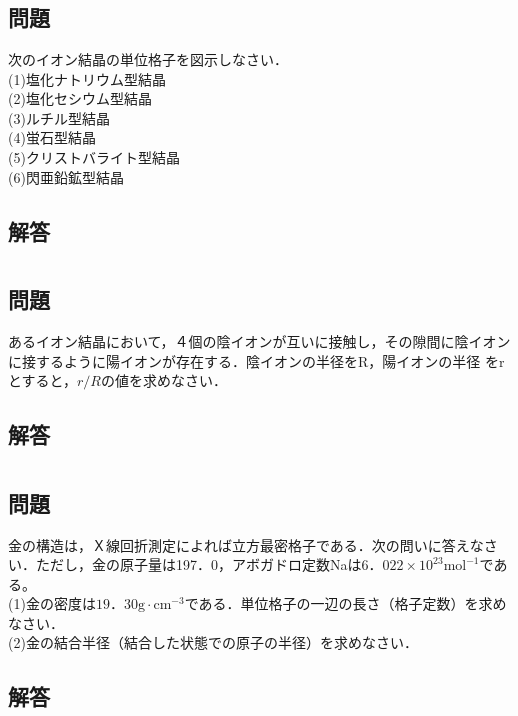 \documentclass[dvipdfmx]{article}
\begin{document}
\section{} 
  \subsection*{問題} %
    次のイオン結晶の単位格子を図示しなさい．\\
    (1)塩化ナトリウム型結晶\\
    (2)塩化セシウム型結晶\\
    (3)ルチル型結晶\\
    (4)蛍石型結晶\\
    (5)クリストバライト型結晶\\
    (6)閃亜鉛鉱型結晶
  \subsection*{解答}

\section{}
  \subsection*{問題} %
    あるイオン結晶において，４個の陰イオンが互いに接触し，その隙間に陰イオンに接するように陽イオンが存在する．陰イオンの半径をR，陽イオンの半径
    をrとすると，$r/R$の値を求めなさい．
  \subsection*{解答}


\section{}
  \subsection*{問題} %
    金の構造は，Ｘ線回折測定によれば立方最密格子である．次の問いに答えなさい．ただし，金の原子量は197．0，アボガドロ定数Naは$\mathrm{6．022 \times 10^{23}mol^{−1}} $である。\\
    (1)金の密度は$\mathrm {19．30 g \cdot cm^{−3} }$である．単位格子の一辺の長さ（格子定数）を求めなさい．\\
    (2)金の結合半径（結合した状態での原子の半径）を求めなさい．
  \subsection*{解答}
  
\end{document}
